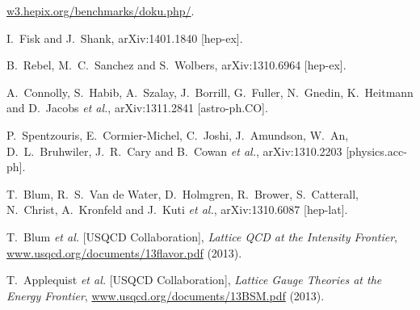 
\begin{thebibliography}{99}

  
\url{w3.hepix.org/benchmarks/doku.php/}.

  I.~Fisk and J.~Shank,
  arXiv:1401.1840 [hep-ex].


  B.~Rebel, M.~C.~Sanchez and S.~Wolbers,
  arXiv:1310.6964 [hep-ex].

  A.~Connolly, S.~Habib, A.~Szalay, J.~Borrill, G.~Fuller, N.~Gnedin, K.~Heitmann and D.~Jacobs {\it et al.},
  arXiv:1311.2841 [astro-ph.CO].

  P.~Spentzouris, E.~Cormier-Michel, C.~Joshi, J.~Amundson, W.~An, D.~L.~Bruhwiler, J.~R.~Cary and B.~Cowan {\it et al.},
  arXiv:1310.2203 [physics.acc-ph].

  T.~Blum, R.~S.~Van de Water, D.~Holmgren, R.~Brower, S.~Catterall, N.~Christ, A.~Kronfeld and J.~Kuti {\it et al.},
  arXiv:1310.6087 [hep-lat].

T.~Blum {\em et al.} [USQCD Collaboration],
{\em Lattice QCD at the Intensity Frontier},
\url{www.usqcd.org/documents/13flavor.pdf} (2013).

T.~Applequist {\em et al.} [USQCD Collaboration],
{\em Lattice Gauge Theories at the Energy Frontier},
\url{www.usqcd.org/documents/13BSM.pdf} (2013).


\end{thebibliography}
